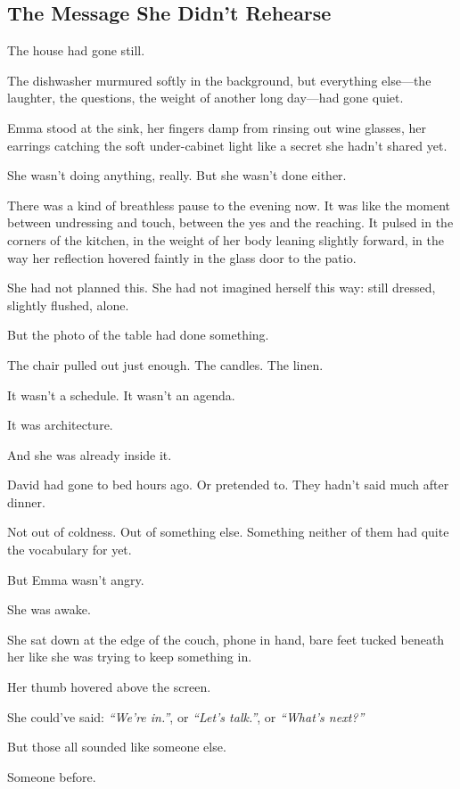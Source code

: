 \subsection{The Message She Didn’t Rehearse}

The house had gone still.

The dishwasher murmured softly in the background, but everything else—the laughter, the questions, 
the weight of another long day—had gone quiet.

Emma stood at the sink, her fingers damp from rinsing out wine glasses, her earrings catching the 
soft under-cabinet light like a secret she hadn’t shared yet.

She wasn’t doing anything, really.
But she wasn’t done either.

There was a kind of breathless pause to the evening now. It was like the moment between undressing and 
touch, between the yes and the reaching. It pulsed in the corners of the kitchen, in the weight of her 
body leaning slightly forward, in the way her reflection hovered faintly in the glass door to the patio.

She had not planned this.
She had not imagined herself this way: still dressed, slightly flushed, alone.

But the photo of the table had done something.

The chair pulled out just enough. The candles. The linen.

It wasn’t a schedule. It wasn’t an agenda.

It was architecture.

And she was already inside it.

David had gone to bed hours ago.
Or pretended to.
They hadn’t said much after dinner.

Not out of coldness.
Out of something else.
Something neither of them had quite the vocabulary for yet.

But Emma wasn’t angry.

She was awake.

She sat down at the edge of the couch, phone in hand, bare feet tucked beneath her like she 
was trying to keep something in.

Her thumb hovered above the screen.

She could’ve said:
\textit{``We’re in.''}, or
\textit{``Let’s talk.''}, or
\textit{``What’s next?''}

But those all sounded like someone else.

Someone before.

